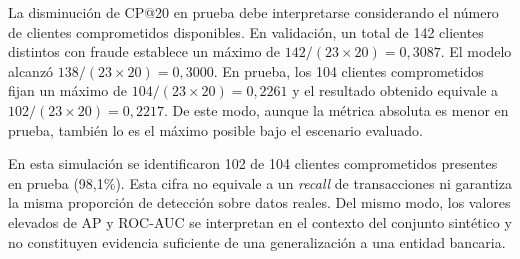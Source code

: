 La disminución de CP@20 en prueba debe interpretarse considerando el número de clientes comprometidos disponibles. En validación, un total de 142 clientes distintos con fraude establece un máximo de $142/(23\times20)=0,3087$. El modelo alcanzó $138/(23\times20)=0,3000$. En prueba, los 104 clientes comprometidos fijan un máximo de $104/(23\times20)=0,2261$ y el resultado obtenido equivale a $102/(23\times20)=0,2217$. De este modo, aunque la métrica absoluta es menor en prueba, también lo es el máximo posible bajo el escenario evaluado.

En esta simulación se identificaron 102 de 104 clientes comprometidos presentes en prueba (98,1\%). Esta cifra no equivale a un \textit{recall} de transacciones ni garantiza la misma proporción de detección sobre datos reales. Del mismo modo, los valores elevados de AP y ROC-AUC se interpretan en el contexto del conjunto sintético y no constituyen evidencia suficiente de una generalización a una entidad bancaria.
